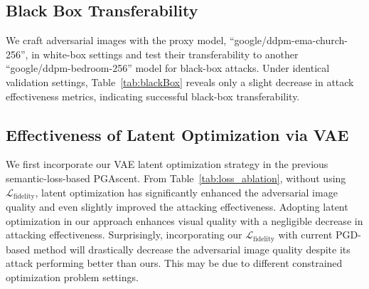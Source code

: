 \subsection{Black Box Transferability}
We craft adversarial images with the proxy model, ``google/ddpm-ema-church-256'', in white-box settings and test their transferability to another ``google/ddpm-bedroom-256'' model for black-box attacks. Under identical validation settings, Table~\ref{tab:blackBox} reveals only a slight decrease in attack effectiveness metrics, indicating successful black-box transferability.



\subsection{Effectiveness of Latent Optimization via VAE}
We first incorporate our VAE latent optimization strategy in the previous semantic-loss-based PGAscent. From Table~\ref{tab:loss_ablation}, without using $\mathcal{L}_\text{fidelity}$, latent optimization has significantly enhanced the adversarial image quality and even slightly improved the attacking effectiveness. Adopting latent optimization in our approach enhances visual quality with a negligible decrease in attacking effectiveness. Surprisingly, incorporating our $\mathcal{L}_\text{fidelity}$ with current PGD-based method will drastically decrease the adversarial image quality despite its attack performing better than ours. This may be due to different constrained optimization problem settings.
